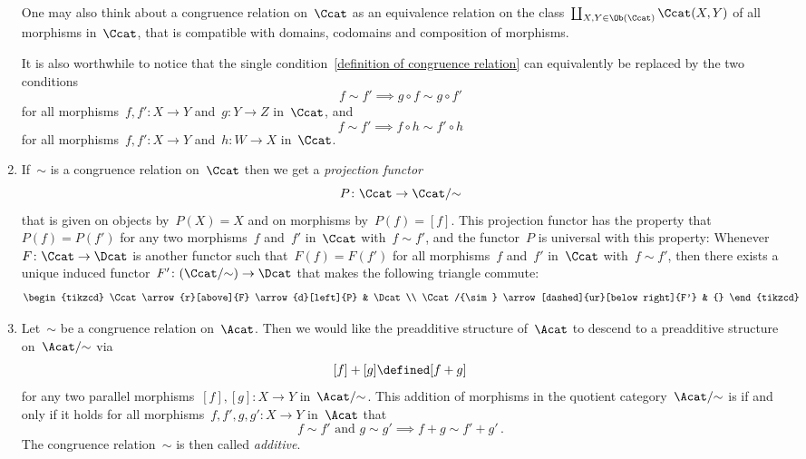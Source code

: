 \begin{remark*}
\begin{enumerate}
      One may also think about a congruence relation on~$\Ccat$ as an equivalence relation on the class~$\coprod_{X, Y \in \Ob(\Ccat)} \Ccat(X,Y)$ of all morphisms in~$\Ccat$, that is compatible with domains, codomains and composition of morphisms.
      
      It is also worthwhile to notice that the single condition~\eqref{definition of congruence relation} can equivalently be replaced by the two conditions
      \[
                  f \sim f'
        \implies  g \circ f \sim g \circ f'
      \]
      for all morphisms~$f, f' \colon X \to Y$ and~$g \colon Y \to Z$ in~$\Ccat$, and
      \[
                  f \sim f'
        \implies  f \circ h \sim f' \circ h
      \]
      for all morphisms~$f, f' \colon X \to Y$ and~$h \colon W \to X$ in~$\Ccat$.
    \item
      If~$\sim$ is a congruence relation on~$\Ccat$ then we get a \emph{projection functor}
      \[
                P
        \colon  \Ccat
        \to     \Ccat/{\sim}
      \]
      that is given on objects by~$P(X) = X$ and on morphisms by~$P(f) = [f]$.
      This projection functor has the property that~$P(f) = P(f')$ for any two morphisms~$f$ and~$f'$ in~$\Ccat$ with~$f \sim f'$, and the functor~$P$ is universal with this property:
      Whenever~$F \colon \Ccat \to \Dcat$ is another functor such that~$F(f) = F(f')$ for all morphisms~$f$ and~$f'$ in~$\Ccat$ with~$f \sim f'$, then there exists a unique induced functor~$F' \colon (\Ccat/{\sim}) \to \Dcat$ that makes the following triangle commute:
      \[
        \begin{tikzcd}
            \Ccat
            \arrow{r}[above]{F}
            \arrow{d}[left]{P}
          & \Dcat
          \\
            \Ccat/{\sim}
            \arrow[dashed]{ur}[below right]{F'}
          & {}
        \end{tikzcd}
      \]
    \item
      Let~$\sim$ be a congruence relation on~$\Acat$.
      Then we would like the preadditive structure of~$\Acat$ to descend to a preadditive structure on~$\Acat/{\sim}$ via
      \[
                  [f] + [g]
        \defined  [f + g]
      \]
      for any two parallel morphisms~$[f], [g] \colon X \to Y$ in~$\Acat/{\sim}$.
      This addition of morphisms in the quotient category~$\Acat/{\sim}$ is {\welldef} if and only if it holds for all morphisms~$f, f', g, g' \colon X \to Y$ in~$\Acat$ that
      \[
        \text{$f \sim f'$ and~$g \sim g'$}
        \implies
        f + g \sim f' + g' \,.
      \]
      The congruence relation~$\sim$ is then called \emph{additive}.
      

\end{enumerate}
\end{remark*}
